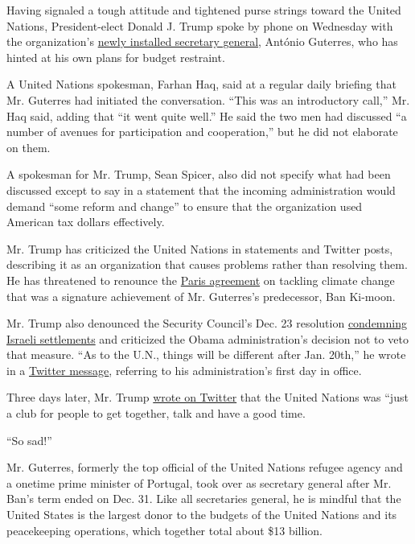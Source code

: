Having signaled a tough attitude and tightened purse strings toward the
United Nations, President-elect Donald J. Trump spoke by phone on
Wednesday with the organization's
\href{https://www.nytimes.com/2016/12/12/us/antonio-guterres-united-nations.html}{newly
installed secretary general}, António Guterres, who has hinted at his
own plans for budget restraint.

A United Nations spokesman, Farhan Haq, said at a regular daily briefing
that Mr. Guterres had initiated the conversation. ``This was an
introductory call,'' Mr. Haq said, adding that ``it went quite well.''
He said the two men had discussed ``a number of avenues for
participation and cooperation,'' but he did not elaborate on them.

A spokesman for Mr. Trump, Sean Spicer, also did not specify what had
been discussed except to say in a statement that the incoming
administration would demand ``some reform and change'' to ensure that
the organization used American tax dollars effectively.

Mr. Trump has criticized the United Nations in statements and Twitter
posts, describing it as an organization that causes problems rather than
resolving them. He has threatened to renounce the
\href{https://www.nytimes.com/2015/12/13/world/europe/climate-change-accord-paris.html}{Paris
agreement} on tackling climate change that was a signature achievement
of Mr. Guterres's predecessor, Ban Ki-moon.

Mr. Trump also denounced the Security Council's Dec. 23 resolution
\href{https://www.nytimes.com/2016/12/23/world/middleeast/israel-settlements-un-vote.html}{condemning
Israeli settlements} and criticized the Obama administration's decision
not to veto that measure. ``As to the U.N., things will be different
after Jan. 20th,'' he wrote in a
\href{https://twitter.com/realDonaldTrump/status/812390964740427776}{Twitter
message}, referring to his administration's first day in office.

Three days later, Mr. Trump
\href{https://twitter.com/realDonaldTrump/status/813500123053490176}{wrote
on Twitter} that the United Nations was ``just a club for people to get
together, talk and have a good time.

``So sad!''

Mr. Guterres, formerly the top official of the United Nations refugee
agency and a onetime prime minister of Portugal, took over as secretary
general after Mr. Ban's term ended on Dec. 31. Like all secretaries
general, he is mindful that the United States is the largest donor to
the budgets of the United Nations and its peacekeeping operations, which
together total about \$13 billion.

